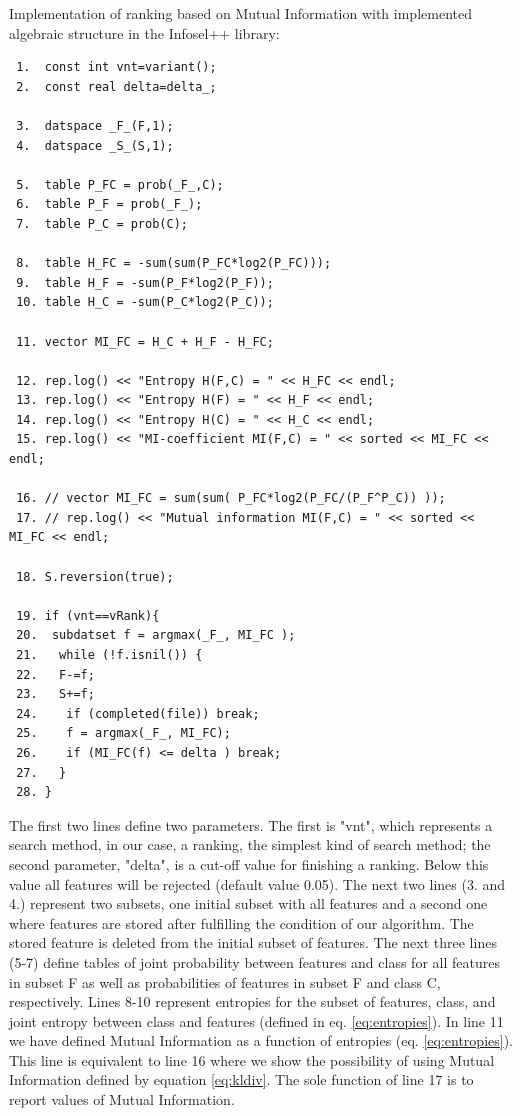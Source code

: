 \documentclass[a4paper,fleqn]{report}
\begin{document}
Implementation of ranking based on Mutual Information with implemented algebraic structure in the Infosel++ library:

{\scriptsize
\begin{verbatim}
 1.  const int vnt=variant();
 2.  const real delta=delta_;

 3.  datspace _F_(F,1);
 4.  datspace _S_(S,1);

 5.  table P_FC = prob(_F_,C);
 6.  table P_F = prob(_F_);
 7.  table P_C = prob(C);

 8.  table H_FC = -sum(sum(P_FC*log2(P_FC)));
 9.  table H_F = -sum(P_F*log2(P_F));
 10. table H_C = -sum(P_C*log2(P_C));

 11. vector MI_FC = H_C + H_F - H_FC;

 12. rep.log() << "Entropy H(F,C) = " << H_FC << endl;
 13. rep.log() << "Entropy H(F) = " << H_F << endl;
 14. rep.log() << "Entropy H(C) = " << H_C << endl;
 15. rep.log() << "MI-coefficient MI(F,C) = " << sorted << MI_FC << endl;

 16. // vector MI_FC = sum(sum( P_FC*log2(P_FC/(P_F^P_C)) ));
 17. // rep.log() << "Mutual information MI(F,C) = " << sorted << MI_FC << endl;

 18. S.reversion(true);

 19. if (vnt==vRank){
 20.  subdatset f = argmax(_F_, MI_FC );
 21.   while (!f.isnil()) {
 22.   F-=f;
 23.   S+=f;
 24.    if (completed(file)) break; 
 25.    f = argmax(_F_, MI_FC);
 26.    if (MI_FC(f) <= delta ) break;
 27.   }
 28. }
\end{verbatim}
}

The first two lines define two parameters. The first is "vnt", which represents a search method, in our case, a ranking, 
the simplest kind of search method; the second parameter, "delta", is a cut-off value for finishing a ranking.
Below this value all features will be rejected (default value 0.05). 
The next two lines (3. and 4.) represent two subsets, one initial subset with all features and a second one where features 
are stored after fulfilling the condition of our algorithm. The stored feature is deleted from the initial subset of features.
The next three lines (5-7) define tables of joint probability between features and class for all features 
in subset F as well as probabilities of features in subset F and class C, respectively.
Lines 8-10 represent entropies for the subset of features, class, and joint entropy between class and
features (defined in eq. \ref{eq:entropies}). In line 11 we have defined Mutual Information as a function of entropies 
(eq. \ref{eq:entropies}). This line is equivalent to line 16 where we show the possibility of using Mutual 
Information defined by equation \ref{eq:kldiv}. The sole function of line 17 is to report values of Mutual Information.
\end{document}
